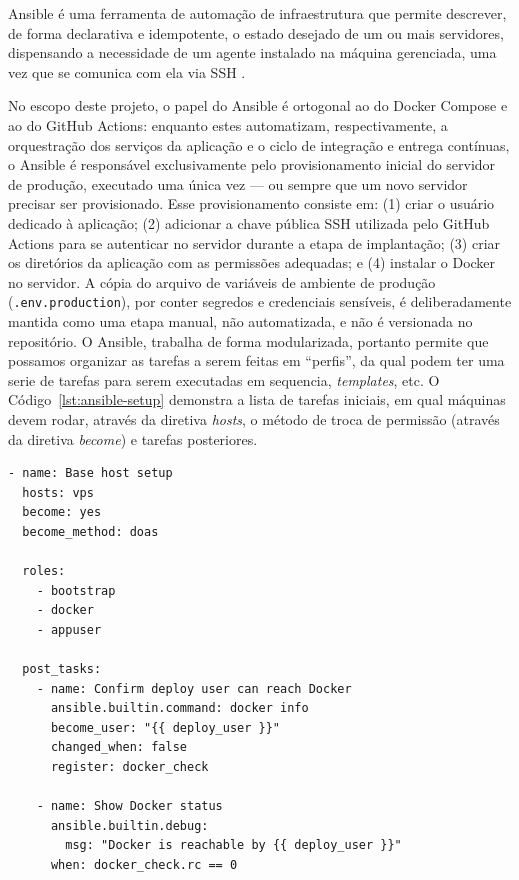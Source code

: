 Ansible é uma ferramenta de automação de infraestrutura que permite
descrever, de forma declarativa e idempotente, o estado desejado de um ou
mais servidores, dispensando a necessidade de um agente instalado na máquina
gerenciada, uma vez que se comunica com ela via SSH \citep{ansible:2026}.

No escopo deste projeto, o papel do Ansible é ortogonal ao do Docker Compose
e ao do GitHub Actions: enquanto estes automatizam, respectivamente,
a orquestração dos serviços da aplicação e o ciclo de integração e entrega
contínuas, o Ansible é responsável exclusivamente pelo provisionamento inicial
do servidor de produção, executado uma única vez --- ou sempre que um novo
servidor precisar ser provisionado. Esse provisionamento consiste em: (1) criar
o usuário dedicado à aplicação; (2) adicionar a chave pública SSH utilizada
pelo GitHub Actions para se autenticar no servidor durante a etapa de
implantação; (3) criar os diretórios da aplicação com as permissões adequadas;
e (4) instalar o Docker no servidor. A cópia do arquivo de variáveis de
ambiente de produção (\texttt{.env.production}), por conter segredos
e credenciais sensíveis, é deliberadamente mantida como uma etapa manual, não
automatizada, e não é versionada no repositório. O Ansible, trabalha de forma
modularizada, portanto permite que possamos organizar as tarefas a serem feitas
em ``perfis'', da qual podem ter uma serie de tarefas para serem executadas em
sequencia, \textit{templates}, etc. O Código~\ref{lst:ansible-setup} demonstra
a lista de tarefas iniciais, em qual máquinas devem rodar, através da diretiva
\textit{hosts}, o método de troca de permissão (através da diretiva
\textit{become}) e tarefas posteriores.

\begin{lstlisting}[caption={Provisionamento utilizando um \textit{playbook} de configuração}, label={lst:ansible-setup}]
- name: Base host setup
  hosts: vps
  become: yes
  become_method: doas

  roles:
    - bootstrap
    - docker
    - appuser

  post_tasks:
    - name: Confirm deploy user can reach Docker
      ansible.builtin.command: docker info
      become_user: "{{ deploy_user }}"
      changed_when: false
      register: docker_check

    - name: Show Docker status
      ansible.builtin.debug:
        msg: "Docker is reachable by {{ deploy_user }}"
      when: docker_check.rc == 0
\end{lstlisting}

